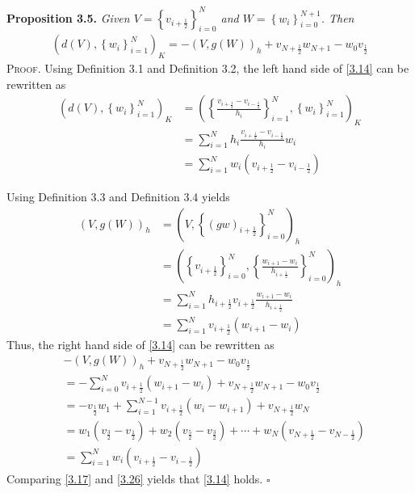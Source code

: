 \documentclass[a4paper]{article}
\numberwithin{equation}{section}
\begin{document}
\textbf{Proposition 3.5.} \textit{Given $V=\left\{ {{v_{i + \frac{1}{2}}}} \right\}_{i = 0}^N$ and $W=\left\{ {{w_i}} \right\}_{i = 0}^{N + 1}$. Then}
\begin{align}
\label{3.14}
{\left( {d\left( V \right),\left\{ {{w_i}} \right\}_{i = 1}^N} \right)_K} =  - {\left( {V,g\left( W \right)} \right)_h} + {v_{N + \frac{1}{2}}}{w_{N + 1}} - {w_0}{v_{\frac{1}{2}}}
\end{align}
\textsc{Proof.} Using Definition 3.1 and Definition 3.2, the left hand side of \eqref{3.14} can be rewritten as
\begin{align}
{\left( {d\left( V \right),\left\{ {{w_i}} \right\}_{i = 1}^N} \right)_K} &= {\left( {\left\{ {\frac{{{v_{i + \frac{1}{2}}} - {v_{i - \frac{1}{2}}}}}{{{h_i}}}} \right\}_{i = 1}^N,\left\{ {{w_i}} \right\}_{i = 1}^N} \right)_K}\\
& = \sum\limits_{i = 1}^N {{h_i}\frac{{{v_{i + \frac{1}{2}}} - {v_{i - \frac{1}{2}}}}}{{{h_i}}}{w_i}} \\
& = \sum\limits_{i = 1}^N {{w_i}\left( {{v_{i + \frac{1}{2}}} - {v_{i - \frac{1}{2}}}} \right)} \label{3.17}
\end{align}

Using Definition 3.3 and Definition 3.4 yields
\begin{align}
{\left( {V,g\left( W \right)} \right)_h} &= {\left( {V,\left\{ {{{\left( {gw} \right)}_{i + \frac{1}{2}}}} \right\}_{i = 0}^N} \right)_h}\\
 &= {\left( {\left\{ {{v_{i + \frac{1}{2}}}} \right\}_{i = 0}^N,\left\{ {\frac{{{w_{i + 1}} - {w_i}}}{{{h_{i + \frac{1}{2}}}}}} \right\}_{i = 0}^N} \right)_h}\\
 &= \sum\limits_{i = 1}^N {{h_{i + \frac{1}{2}}}{v_{i + \frac{1}{2}}}\frac{{{w_{i + 1}} - {w_i}}}{{{h_{i + \frac{1}{2}}}}}} \\
 &= \sum\limits_{i = 1}^N {{v_{i + \frac{1}{2}}}\left( {{w_{i + 1}} - {w_i}} \right)} 
\end{align}
Thus, the right hand side of \eqref{3.14} can be rewritten as
\begin{align}
 &- {\left( {V,g\left( W \right)} \right)_h} + {v_{N + \frac{1}{2}}}{w_{N + 1}} - {w_0}{v_{\frac{1}{2}}}\\
 &=  - \sum\limits_{i = 0}^N {{v_{i + \frac{1}{2}}}\left( {{w_{i + 1}} - {w_i}} \right)}  + {v_{N + \frac{1}{2}}}{w_{N + 1}} - {w_0}{v_{\frac{1}{2}}}\\
& =  - {v_{\frac{1}{2}}}{w_1} + \sum\limits_{i = 1}^{N - 1} {{v_{i + \frac{1}{2}}}\left( {{w_i} - {w_{i + 1}}} \right)}  + {v_{N + \frac{1}{2}}}{w_N}\\
& = {w_1}\left( {{v_{\frac{3}{2}}} - {v_{\frac{1}{2}}}} \right) + {w_2}\left( {{v_{\frac{5}{2}}} - {v_{\frac{3}{2}}}} \right) +  \cdots  + {w_N}\left( {{v_{N + \frac{1}{2}}} - {v_{N - \frac{1}{2}}}} \right)\\
& = \sum\limits_{i = 1}^N {{w_i}\left( {{v_{i + \frac{1}{2}}} - {v_{i - \frac{1}{2}}}} \right)} \label{3.26}
\end{align}
Comparing \eqref{3.17} and \eqref{3.26} yields that \eqref{3.14} holds. \hfill $\square$\\
\end{document}
